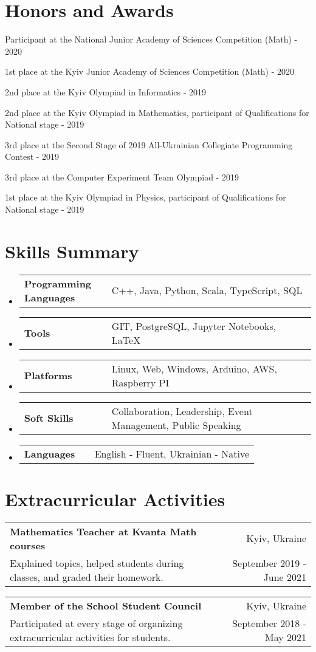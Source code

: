 \documentclass[a4paper,21pt]{article}
\makeatletter
\newcommand{\nonBulletResumeSubheading}[4]{
  \vspace{-1pt}\normalsize{ \item[]
    \begin{tabular*}{0.97\textwidth}{l@{\extracolsep{\fill}}r}
      \textbf{#1} & #2 \\
      #3 & #4 \\
    \end{tabular*}}
    \vspace{-5pt}
}
\newcommand{\resumeSectionType}[2]{
  \item\begin{tabular*}{0.96\textwidth}[t]{
    p{0.3\linewidth}p{0.7\linewidth}
  }
    \textbf{#1} & #2
  \end{tabular*}\vspace{-6pt}
}
\newcommand{\resumeSubHeadingListStart}{\begin{itemize}[leftmargin=*]}
\newcommand{\resumeSubHeadingListEnd}{\end{itemize}}
\makeatother
\begin{document}
\vspace{-5pt}
\section{Honors and Awards}
\begin{description}[font=$\bullet$]
\item {Participant at the National Junior Academy of Sciences Competition (Math) - 2020}
\vspace{-5pt}
\item {1st place at the Kyiv Junior Academy of Sciences Competition (Math) - 2020}
\vspace{-5pt}
\item {2nd place at the Kyiv Olympiad in Informatics - 2019}
\vspace{-5pt}
\item {2nd place at the Kyiv Olympiad in Mathematics, participant of Qualifications for National stage - 2019}
\vspace{-5pt}
\item {3rd place at the Second Stage of 2019 All-Ukrainian Collegiate Programming Contest - 2019}
\vspace{-5pt}
\item {3rd place at the Computer Experiment Team Olympiad - 2019}
\vspace{-5pt}
\item {1st place at the Kyiv Olympiad in Physics, participant of Qualifications for National stage - 2019}
\end{description}


\vspace{-5pt}
\section{Skills Summary}
    \resumeSubHeadingListStart
        \resumeSectionType{Programming Languages}{C++, Java, Python, Scala, TypeScript, SQL}
        \resumeSectionType{Tools}{GIT, PostgreSQL, Jupyter Notebooks, \LaTeX}
        \resumeSectionType{Platforms}{Linux, Web, Windows, Arduino, AWS, Raspberry PI}
        \resumeSectionType{Soft Skills}{Collaboration, Leadership, Event Management, Public Speaking}
        \resumeSectionType{Languages}{English - Fluent, Ukrainian - Native}
    \resumeSubHeadingListEnd

\vspace{-6pt}
\section{Extracurricular Activities}
  \resumeSubHeadingListStart
	\nonBulletResumeSubheading
    {Mathematics Teacher at Kvanta Math courses}{Kyiv, Ukraine}
    {Explained topics, helped students during classes, and graded their homework.}{September 2019 - June 2021}
    \nonBulletResumeSubheading
    {Member of the School Student Council}{Kyiv, Ukraine}
    {Participated at every stage of organizing extracurricular activities for students.}{September 2018 - May 2021}

\resumeSubHeadingListEnd
\end{document}
